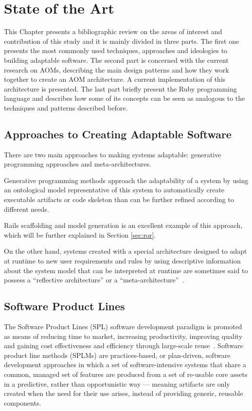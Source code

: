 \chapter{State of the Art}\label{chap:sota}

This Chapter presents a bibliographic review on the areas of interest and contribution of this study and it is mainly divided in three parts. The first one presents the most commonly used techniques, approaches and ideologies to building adaptable software. The second part is concerned with the current research on AOMs, describing the main design patterns and how they work together to create an AOM architecture. A current implementation of this architecture is presented. The last part briefly present the Ruby programming language and describes how some of its concepts can be seen as analogous to the techniques and patterns described before.

\section{Approaches to Creating Adaptable Software}\label{sec:approaches_to_creating_adaptable_software}

There are two main approaches to making systems adaptable: generative programming approaches and meta-architectures.

Generative programming methods approach the adaptability of a system by using an ontological model representative of this system to automatically create executable artifacts or code skeleton than can be further refined according to different needs.

Rails scaffolding and model generation is an excellent example of this approach, which will be further explained in Section \ref{sec:ror}.

On the other hand, systems created with a special architecture designed to adapt at runtime to new user requirements and rules by using descriptive information about the system model that can be interpreted at runtime are sometimes said to possess a ``reflective architecture'' or a ``meta-architecture''~\cite{YBJ01}.

\section{Software Product Lines}\label{sec:spl}

The Software Product Lines (SPL) software development paradigm is promoted as means of reducing time to market, increasing productivity, improving quality and gaining cost effectiveness and efficiency through large-scale reuse~\cite{TC06}. Software product line methods (SPLMs) are practices-based, or plan-driven, software development approaches in which a set of software-intensive systems that share a common, managed set of features are produced from a set of re-usable core assets in a predictive, rather than opportunistic way --- meaning artifacts are only created when the need for their use arises, instead of providing generic, reusable components.

